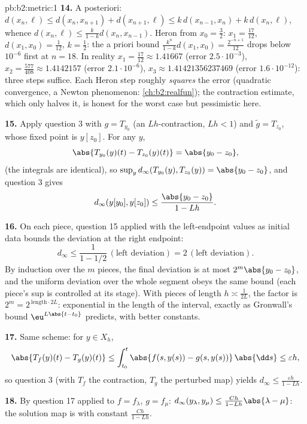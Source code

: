 \begin{solution}{pb:b2:metric:1}
\textbf{14.} A posteriori: $d(x_n, \ell) \leq d(x_n, x_{n+1}) +
d(x_{n+1}, \ell) \leq k\,d(x_{n-1}, x_n) + k\,d(x_n, \ell)$,
whence $d(x_n, \ell) \leq \frac{k}{1-k}d(x_n, x_{n-1})$. Heron
from $x_0 = \frac32$: $x_1 = \frac{17}{12}$, $d(x_1, x_0) =
\frac1{12}$, $k = \frac12$: the a priori bound
$\frac{k^n}{1-k}d(x_1,x_0) = \frac{2^{-n+1}}{12}$ drops below
$10^{-6}$ first at $n = 18$. In reality $x_1 = \frac{17}{12}
\approx 1.41667$ (error $2.5\cdot10^{-3}$), $x_2 =
\frac{577}{408} \approx 1.4142157$ (error $2.1\cdot10^{-6}$),
$x_3 \approx 1.41421356237469$ (error $1.6\cdot10^{-12}$):
three steps suffice. Each Heron step roughly \emph{squares} the
error (quadratic convergence, a Newton phenomenon:
\cref{ch:b2:realfun}); the contraction estimate, which only
halves it, is honest for the worst case but pessimistic here.

\textbf{15.} Apply question 3 with $g = T_{y_0}$ (an
$Lh$-contraction, $Lh < 1$) and $\widetilde g = T_{z_0}$, whose
fixed point is $y[z_0]$. For any $y$,
\[
\abs{T_{y_0}(y)(t) - T_{z_0}(y)(t)} = \abs{y_0 - z_0},
\]
(the integrals are identical), so $\sup_y
d_\infty(T_{y_0}(y), T_{z_0}(y)) = \abs{y_0 - z_0}$, and
question 3 gives
\[
d_\infty(y[y_0], y[z_0]) \leq \frac{\abs{y_0 - z_0}}{1 - Lh} .
\]

\textbf{16.} On each piece, question 15 applied with the
left-endpoint values as initial data bounds the deviation at
the right endpoint:
\[
d_\infty \leq \frac{1}{1 - 1/2}\,(\text{left deviation})
= 2\,(\text{left deviation}) .
\] By
induction over the $m$ pieces, the final deviation is at most
$2^m\abs{y_0 - z_0}$, and the uniform deviation over the whole
segment obeys the same bound (each piece's sup is controlled at
its stage). With pieces of length $h \asymp \frac1{2L}$, the
factor is $2^m = 2^{\,\text{length}\cdot 2L}$: exponential in
the length of the interval, exactly as Gronwall's bound
$\eu^{L\abs{t-t_0}}$ predicts, with better constants.

\textbf{17.} Same scheme: for $y \in X_h$,
\[
\abs{T_f(y)(t) - T_g(y)(t)} \leq \int_{t_0}^t \abs{f(s,y(s)) -
g(s,y(s))}\,\abs{\dd s} \leq \varepsilon h ,
\]
so question 3 (with $T_f$ the contraction, $T_g$ the perturbed
map) yields $d_\infty \leq \frac{\varepsilon h}{1 - Lh}$.

\textbf{18.} By question 17 applied to $f = f_\lambda$, $g =
f_\mu$: $d_\infty(y_\lambda, y_\mu) \leq \frac{Ch}{1 -
Lh}\abs{\lambda - \mu}$: the solution map is  with
constant $\frac{Ch}{1-Lh}$.


\end{solution}

